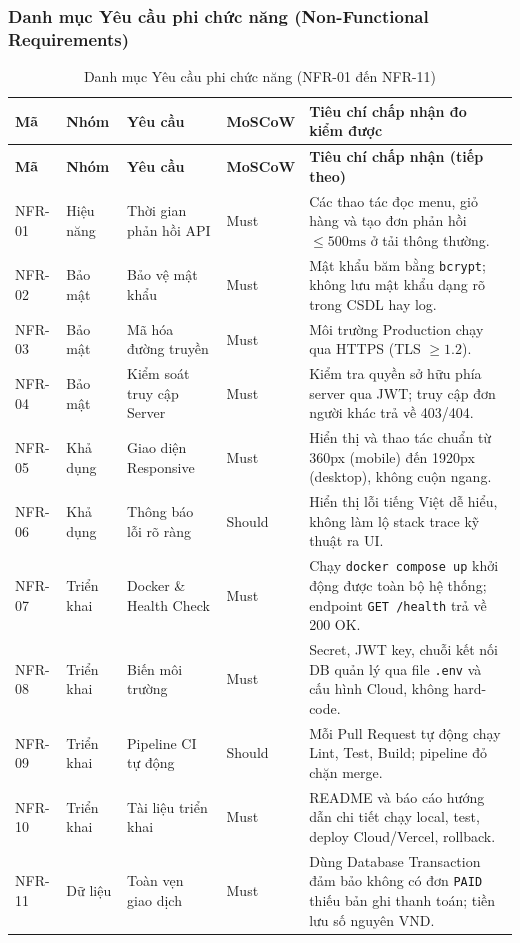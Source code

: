 \subsubsection{Danh mục Yêu cầu phi chức năng (Non-Functional Requirements)}
\small
\renewcommand{\arraystretch}{1.22}
\begin{longtable}{|p{}|p{}|p{}|p{}|p{}|}
\caption{Danh mục Yêu cầu phi chức năng (NFR-01 đến NFR-11)} \\
\hline
\textbf{Mã} & \textbf{Nhóm} & \textbf{Yêu cầu} & \textbf{MoSCoW} & \textbf{Tiêu chí chấp nhận đo kiểm được} \\
\hline
\endfirsthead
\hline
\textbf{Mã} & \textbf{Nhóm} & \textbf{Yêu cầu} & \textbf{MoSCoW} & \textbf{Tiêu chí chấp nhận (tiếp theo)} \\
\hline
\endhead
\hline
\endfoot
NFR-01 & Hiệu năng & Thời gian phản hồi API & Must & Các thao tác đọc menu, giỏ hàng và tạo đơn phản hồi $\le 500\text{ms}$ ở tải thông thường. \\
\hline
NFR-02 & Bảo mật & Bảo vệ mật khẩu & Must & Mật khẩu băm bằng \texttt{bcrypt}; không lưu mật khẩu dạng rõ trong CSDL hay log. \\
\hline
NFR-03 & Bảo mật & Mã hóa đường truyền & Must & Môi trường Production chạy qua HTTPS (TLS $\ge 1.2$). \\
\hline
NFR-04 & Bảo mật & Kiểm soát truy cập Server & Must & Kiểm tra quyền sở hữu phía server qua JWT; truy cập đơn người khác trả về 403/404. \\
\hline
NFR-05 & Khả dụng & Giao diện Responsive & Must & Hiển thị và thao tác chuẩn từ 360px (mobile) đến 1920px (desktop), không cuộn ngang. \\
\hline
NFR-06 & Khả dụng & Thông báo lỗi rõ ràng & Should & Hiển thị lỗi tiếng Việt dễ hiểu, không làm lộ stack trace kỹ thuật ra UI. \\
\hline
NFR-07 & Triển khai & Docker \& Health Check & Must & Chạy \texttt{docker compose up} khởi động được toàn bộ hệ thống; endpoint \texttt{GET /health} trả về 200 OK. \\
\hline
NFR-08 & Triển khai & Biến môi trường & Must & Secret, JWT key, chuỗi kết nối DB quản lý qua file \texttt{.env} và cấu hình Cloud, không hard-code. \\
\hline
NFR-09 & Triển khai & Pipeline CI tự động & Should & Mỗi Pull Request tự động chạy Lint, Test, Build; pipeline đỏ chặn merge. \\
\hline
NFR-10 & Triển khai & Tài liệu triển khai & Must & README và báo cáo hướng dẫn chi tiết chạy local, test, deploy Cloud/Vercel, rollback. \\
\hline
NFR-11 & Dữ liệu & Toàn vẹn giao dịch & Must & Dùng Database Transaction đảm bảo không có đơn \texttt{PAID} thiếu bản ghi thanh toán; tiền lưu số nguyên VND. \\
\hline
\end{longtable}
\normalsize


